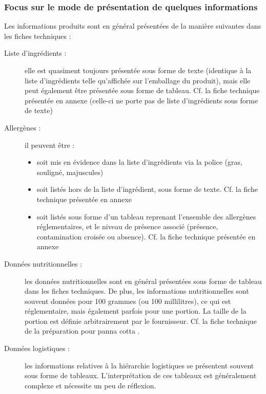                \subsubsection{Focus sur le mode de présentation de quelques informations}
            Les informations produits sont en général présentées de la manière suivantes dans les fiches techniques :
            \begin{description}
                \item[Liste d'ingrédients : ] elle est quasiment toujours présentée sous forme de texte (identique à la liste d'ingrédients telle qu'affichée sur l'emballage du produit), mais elle peut également être présentée sous forme de tableau. Cf. la fiche technique présentée en annexe  (celle-ci ne porte pas de liste d'ingrédients sous forme de texte)
                \item[Allergènes : ] il peuvent être :
                \begin{itemize}
                    \item soit mis en évidence dans la liste d'ingrédients via la police (gras, souligné, majuscules)
                    \item soit listés hors de la liste d'ingrédient, sous forme de texte. Cf. la fiche technique présentée en annexe 
                    \item soit listés sous forme d'un tableau reprenant l'ensemble des allergènes réglementaires, et le niveau de présence associé (présence, contamination croisée ou absence). Cf. la fiche technique présentée en annexe 
                \end{itemize}
                \item[Données nutritionnelles : ] les données nutritionnelles sont en général présentées sous forme de tableau dans les fiches techniques. De plus, les informations nutritionnelles sont souvent données pour 100 grammes (ou 100 millilitres), ce qui est réglementaire, mais également parfois pour une portion. La taille de la portion est définie arbitrairement par le fournisseur.
                Cf. la fiche technique de la préparation pour panna cotta .
                \item[Données logistiques : ] les informations relatives à la hiérarchie logistiques se présentent souvent sous forme de tableaux.
                L'interprétation de ces tableaux est généralement complexe et nécessite un peu de réflexion.
            \end{description}
            
